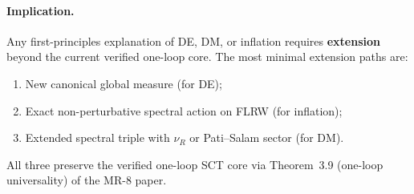 \documentclass[12pt,a4paper]{article}
\begin{document}
\paragraph{Implication.}
Any first-principles explanation of DE, DM, or inflation requires
\textbf{extension} beyond the current verified one-loop core.
The most minimal extension paths are:
\begin{enumerate}
  \item New canonical global measure (for DE);
  \item Exact non-perturbative spectral action on FLRW (for inflation);
  \item Extended spectral triple with $\nu_R$ or Pati--Salam sector (for DM).
\end{enumerate}
All three preserve the verified one-loop SCT core via Theorem~3.9
(one-loop universality) of the MR-8 paper.
\end{document}
